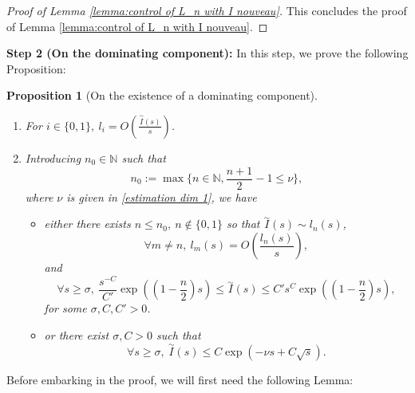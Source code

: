 \documentclass[11pt,a4paper]{article}
\newcommand{\1}{\mathbbm{1}}
\numberwithin{equation}{section}
\newcommand{\numberset}{\mathbb}
\newcommand{\N}{\numberset{N}}
\newtheorem{prp}[lemma]{Proposition}
\theoremstyle{remark}
\begin{document}
\begin{proof}[Proof of Lemma \ref{lemma:control of L_n with I nouveau}]
This concludes the proof of Lemma \ref{lemma:control of L_n with I nouveau}.
\end{proof}








\textbf{Step 2 (On the dominating component): }
In this step, we prove the following Proposition:
\begin{prp}[On the existence of a dominating component]\label{prp:switch}
$ $
\begin{enumerate}[label=(\roman*)]
\item For $i\in \{0,1\},\ l_i=O\left(\frac{\overset{\sim}{I}(s)}{s}\right)$.\label{l0,l1}

\item Introducing $n_0\in \N$ such that 
\begin{equation}\label{def n0}
n_0:=\max\{n\in \N, \frac{n+1}{2}-1\leq\nu\},
\end{equation}
where $\nu$ is given in \eqref{estimation dim 1}, we have
\begin{itemize}
\item either there exists $n\leq n_0,\ n\notin \{0,1\}$ so that $\overset{\sim}{I}(s)\sim l_n(s)$,
\begin{equation}\label{inequality m & n}
\forall m\neq n,\ l_m(s)=O\left(\frac{l_n(s)}{s}\right),
\end{equation}
and
\begin{equation}\label{inequality 2}
\forall s\geq \sigma,\ \frac{s^{-C}}{C'}\exp\left(\left(1-\frac{n}{2}\right)s\right)\leq \overset{\sim}{I}(s)\leq C's^C\exp\left(\left(1-\frac{n}{2}\right)s\right),
\end{equation}
for some $\sigma,C,C'>0$.

\item or there exist $\sigma, C>0$ such that
\begin{equation}\label{inequality 1}
\forall s\geq \sigma,\ \overset{\sim}{I}(s)\leq C \exp(-\nu s+C\sqrt{s}).
\end{equation}

\end{itemize}
\end{enumerate}
\end{prp}

Before embarking in the proof, we will first need the following Lemma:
\end{document}
